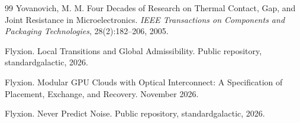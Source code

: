 \documentclass[11pt,openany]{book}
\theoremstyle{plain}
\theoremstyle{definition}
\theoremstyle{remark}
\begin{document}
\begin{thebibliography}{99}
Yovanovich, M. M.
\newblock Four Decades of Research on Thermal Contact, Gap, and Joint Resistance in Microelectronics.
\newblock \emph{IEEE Transactions on Components and Packaging Technologies}, 28(2):182--206, 2005.

Flyxion.
\newblock Local Transitions and Global Admissibility.
\newblock Public repository, standardgalactic, 2026.

Flyxion.
\newblock Modular GPU Clouds with Optical Interconnect: A Specification of Placement, Exchange, and Recovery.
\newblock November 2026.

Flyxion.
\newblock Never Predict Noise.
\newblock Public repository, standardgalactic, 2026.

\end{thebibliography}
\endgroup
\end{document}
